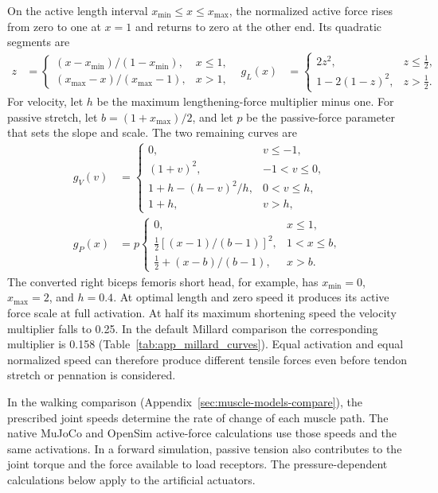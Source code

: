 On the active length interval $x_{\min}\leq x\leq x_{\max}$, the normalized active force rises from zero to one at $x=1$ and returns to zero at the other end. Its quadratic segments are
\begin{equation}
 \begin{aligned}
 z&=\begin{cases}(x-x_{\min})/(1-x_{\min}),&x\leq1,\\
 (x_{\max}-x)/(x_{\max}-1),&x>1,\end{cases} &
 g_L(x)&=\begin{cases}2z^2,&z\leq\tfrac12,\\
 1-2(1-z)^2,&z>\tfrac12.\end{cases}
 \end{aligned}
 \label{eq:app_mj_length}
\end{equation}
For velocity, let $h$ be the maximum lengthening-force multiplier minus one. For passive stretch, let $b=(1+x_{\max})/2$, and let $p$ be the passive-force parameter that sets the slope and scale. The two remaining curves are
\begin{align}
 g_V(v)&=\begin{cases}
 0,&v\leq-1,\\ (1+v)^2,&-1<v\leq0,\\
 1+h-(h-v)^2/h,&0<v\leq h,\\ 1+h,&v>h,
 \end{cases}\label{eq:app_mj_velocity}\\[3pt]
 g_P(x)&=p\begin{cases}
 0,&x\leq1,\\ \tfrac12[(x-1)/(b-1)]^2,&1<x\leq b,\\
 \tfrac12+(x-b)/(b-1),&x>b.
 \end{cases}\label{eq:app_mj_passive}
\end{align}
The converted right biceps femoris short head, for example, has $x_{\min}=0$, $x_{\max}=2$, and $h=0.4$. At optimal length and zero speed it produces its active force scale at full activation. At half its maximum shortening speed the velocity multiplier falls to 0.25. In the default Millard comparison the corresponding multiplier is 0.158 (Table~\ref{tab:app_millard_curves}). Equal activation and equal normalized speed can therefore produce different tensile forces even before tendon stretch or pennation is considered.

In the walking comparison (Appendix~\ref{sec:muscle-models-compare}), the prescribed joint speeds determine the rate of change of each muscle path. The native MuJoCo and OpenSim active-force calculations use those speeds and the same activations. In a forward simulation, passive tension also contributes to the joint torque and the force available to load receptors. The pressure-dependent calculations below apply to the artificial actuators.

